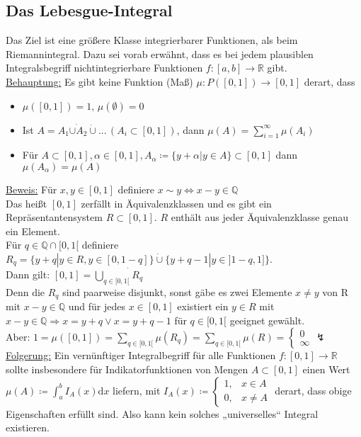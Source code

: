 \subsection{Das Lebesgue-Integral}

Das Ziel ist eine größere Klasse integrierbarer Funktionen, als beim Riemannintegral. Dazu sei vorab erwähnt, dass es bei jedem plausiblen Integralsbegriff nichtintegrierbare Funktionen $f\colon [a,b] \to \mathbb{R}$ gibt.\\
\underline{Behauptung:} Es gibt keine Funktion (Maß) $\mu\colon P([0,1]) \to [0,1]$ derart, dass
\begin{itemize}
	\item $\mu([0,1]) = 1, \, \mu(\emptyset) = 0$
	\item Ist $A = A_1 \dot{\cup A_2} \dot{\cup} ... \,(A_i \subset [0,1])$, dann $\mu(A) = \sum_{i=1}^{\infty} \mu(A_i)$
	\item Für $A \subset [0,1], \alpha \in [0,1], A_{\alpha} \coloneqq \{y + \alpha | y \in A\} \subset [0,1]$ dann $\mu(A_{\alpha}) = \mu(A)$
\end{itemize}
\underline{Beweis:} Für $x,y\in [0,1]$ definiere $x \sim y \Leftrightarrow x-y \in \mathbb{Q}$\\
Das heißt $[0,1]$ zerfällt in Äquivalenzklassen und es gibt ein Repräsentantensystem $R \subset [0,1]$. $R$ enthält aus jeder Äquivalenzklasse genau ein Element.\\
Für $q\in \mathbb{Q} \cap [0,1[$ definiere $R_q = \{y + q | y \in R, y \in [0,1-q]\} \dot{\cup} \{ y+q-1|y \in ]1-q,1] \}$.\\
Dann gilt: $[0,1] = \dot{\bigcup_{q\in[0,1[}} R_q$\\
Denn die $R_q$ sind paarweise disjunkt, sonst gäbe es zwei Elemente $x\neq y$ von R mit $x-y \in \mathbb{Q}$ und für jedes $x \in [0,1]$ existiert ein $y \in R$ mit $x-y \in \mathbb{Q} \Rightarrow x = y + q \lor x = y + q - 1$ für $q\in [0,1[$ geeignet gewählt.\\
Aber: $1 = \mu([0,1]) = \sum_{q \in [0,1[} \mu(R_q) = \sum_{q \in [0,1[} \mu(R) =
\left \{
\begin{matrix}
0\\
\infty
\end{matrix}
\right . \lightning$\\
\underline{Folgerung:} Ein vernünftiger Integralbegriff für alle Funktionen $f\colon [0,1] \to \mathbb{R}$ sollte insbesondere für Indikatorfunktionen von Mengen $A \subset [0,1]$ einen Wert $\mu(A)\coloneqq \int_{a}^{b} I_A(x) \text{d}x$ liefern, mit $I_A(x) \coloneqq \left \{ \begin{matrix}
1, & x \in A\\
0, & x \ne A
\end{matrix}
\right .$ derart, dass obige Eigenschaften erfüllt sind. Also kann kein solches „universelles“ Integral existieren.

